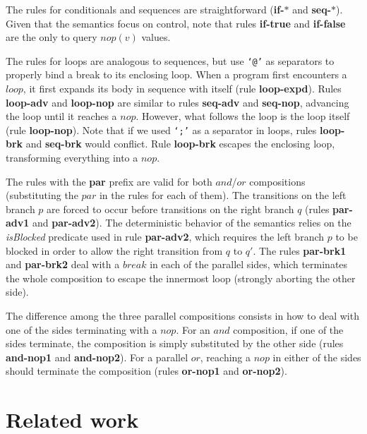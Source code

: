 \documentclass{acm_proc_article-sp}
\newcommand{\code}[1] {{\small{\texttt{#1}}}}
\newcommand{\rr}[1] {{\textbf{\scriptsize{#1}}}}
\newcommand{\1}{\;}
\newcommand{\2}{\;\;}
\newcommand{\3}{\;\;\;}
\newcommand{\5}{\;\;\;\;\;}
\begin{document}
The rules for conditionals and sequences are straightforward (\rr{if-$*$} and 
\rr{seq-$*$}).
%
Given that the semantics focus on control, note that rules \rr{if-true} and 
\rr{if-false} are the only to query $nop(v)$ values.

The rules for loops are analogous to sequences, but use \code{`@'} as 
separators to properly bind a break to its enclosing loop.
%
When a program first encounters a $loop$, it first expands its body in sequence 
with itself (rule \rr{loop-expd}).
Rules \rr{loop-adv} and \rr{loop-nop} are similar to rules \rr{seq-adv} and 
\rr{seq-nop}, advancing the loop until it reaches a $nop$.
However, what follows the loop is the loop itself (rule \rr{loop-nop}).
Note that if we used \code{`;'} as a separator in loops, rules \rr{loop-brk} 
and \rr{seq-brk} would conflict.
%
Rule \rr{loop-brk} escapes the enclosing loop, transforming everything into a 
$nop$.

The rules with the \rr{par} prefix are valid for both $and$/$or$ compositions 
(substituting the $par$ in the rules for each of them).
The transitions on the left branch $p$ are forced to occur before transitions 
on the right branch $q$ (rules \rr{par-adv1} and \rr{par-adv2}).
%
The deterministic behavior of the semantics relies on the \emph{isBlocked} 
predicate used in rule \rr{par-adv2}, which requires the left branch $p$ to be 
blocked in order to allow the right transition from $q$ to $q'$.
%
The rules \rr{par-brk1} and \rr{par-brk2} deal with a $break$ in each of the 
parallel sides, which terminates the whole composition to escape the innermost 
loop (strongly aborting the other side).

The difference among the three parallel compositions consists in how to deal 
with one of the sides terminating with a $nop$.
%
For an $and$ composition, if one of the sides terminate, the composition is 
simply substituted by the other side (rules \rr{and-nop1} and \rr{and-nop2}).
%
For a parallel $or$, reaching a $nop$ in either of the sides should terminate 
the composition (rules \rr{or-nop1} and \rr{or-nop2}).

\section{Related work}
\label{sec.related}
\end{document}
